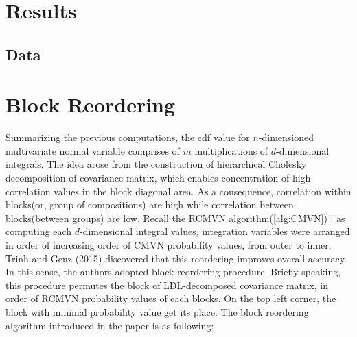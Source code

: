 \section{Results}

\subsection{Data}




\section{Block Reordering}

Summarizing the previous computations, the cdf value for $n$-dimensioned multivariate normal variable comprises of $m$ multiplications of $d$-dimensional integrals. The idea arose from the construction of hierarchical Cholesky decomposition of covariance matrix, which enables concentration of high correlation values in the block diagonal area. As a consequence, correlation within blocks(or, group of compositions) are high while correlation between blocks(between groups) are low. Recall the RCMVN algorithm(\ref{alg:CMVN}) : as computing each $d$-dimensional integral values, integration variables were arranged in order of increasing order of CMVN probability values, from outer to inner. Trinh and Genz (2015) discovered that this reordering improves overall accuracy. In this sense, the authors adopted block reordering procedure. Briefly speaking, this procedure permutes the block of LDL-decomposed covariance matrix, in order of RCMVN probability values of each blocks. On the top left corner, the block with minimal probability value get its place. The block reordering algorithm introduced in the paper is as following:\\

